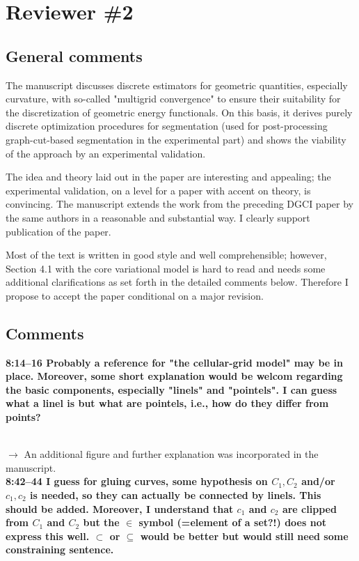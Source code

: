 \documentclass[12pt]{article}
\begin{document}
\section{Reviewer \#2}


\subsection{General comments}
The manuscript discusses discrete estimators for geometric quantities,
especially curvature, with so-called "multigrid convergence" to ensure
their suitability for the discretization of geometric energy functionals.
On this basis, it derives purely discrete optimization procedures for
segmentation (used for post-processing graph-cut-based segmentation in the
experimental part) and shows the viability of the approach by an experimental
validation.

The idea and theory laid out in the paper are interesting and appealing; the
experimental validation, on a level for a paper with accent on theory, is
convincing. The manuscript extends the work from the preceding DGCI paper
by the same authors in a reasonable and substantial way. I clearly support
publication of the paper.

Most of the text is written in good style and well comprehensible; however,
Section 4.1 with the core variational model is hard to read and needs some
additional clarifications as set forth in the detailed comments below.
Therefore I propose to accept the paper conditional on a major revision.

\subsection{Comments}

\textbf{8:14--16 Probably a reference for "the cellular-grid model" may be in place.
Moreover, some short explanation would be welcom regarding the basic
components, especially "linels" and "pointels". I can guess what a linel is
but what are pointels, i.e., how do they differ from points?}

~\\
$\rightarrow$ An additional figure and further explanation was incorporated in the manuscript.
~\\

\textbf{8:42--44 I guess for gluing curves, some hypothesis on $C_1, C_2$ and/or $c_1, c_2$
is needed, so they can actually be connected by linels. This should be added.
Moreover, I understand that $c_1$ and $c_2$ are clipped from $C_1$ and $C_2$ but the
$\in$ symbol (=element of a set?!) does not express this well. $\subset$ or
$\subseteq$ would be better but would still need some constraining sentence.}
\end{document}
